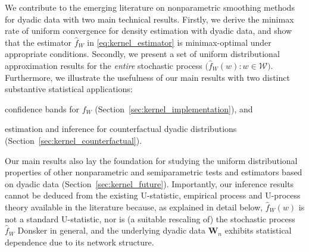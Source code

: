 \documentclass[11pt,lof]{puthesis}
\newcommand{\bW}{\ensuremath{\mathbf{W}}}
\newcommand{\cW}{\ensuremath{\mathcal{W}}}
\theoremstyle{break}
\theoremstyle{proof}
\begin{document}
We contribute to the emerging literature on nonparametric smoothing methods for
dyadic data with two main technical results. Firstly, we derive the minimax
rate of uniform convergence for density estimation with dyadic data, and show
that the estimator $\hat{f}_W$ in \eqref{eq:kernel_estimator} is
minimax-optimal under appropriate conditions. Secondly, we present a set of
uniform distributional approximation results for the \emph{entire} stochastic
process $\big(\hat{f}_W(w):w\in\cW\big)$. Furthermore, we illustrate the
usefulness of our main results with two distinct substantive statistical
applications:
%
\begin{inlineroman}
  \item
    confidence bands for $f_W$ (Section~\ref{sec:kernel_implementation}), and
  \item
    estimation and inference for counterfactual
    dyadic distributions (Section~\ref{sec:kernel_counterfactual}).
\end{inlineroman}
%
Our main results also lay the foundation for studying the uniform
distributional properties of other nonparametric and semiparametric tests and
estimators based on dyadic data (Section~\ref{sec:kernel_future}). Importantly,
our inference results cannot be deduced from the existing U-statistic, empirical
process and U-process theory available in the literature
\citep{van1996weak,gine2021mathematical} because, as explained in detail below,
$\hat{f}_W(w)$ is not a standard U-statistic, nor is
(a suitable rescaling of) the stochastic process
$\hat{f}_W$ Donsker in general, and the underlying dyadic data $\bW_n$ exhibits
statistical dependence due to its network structure.
\end{document}

